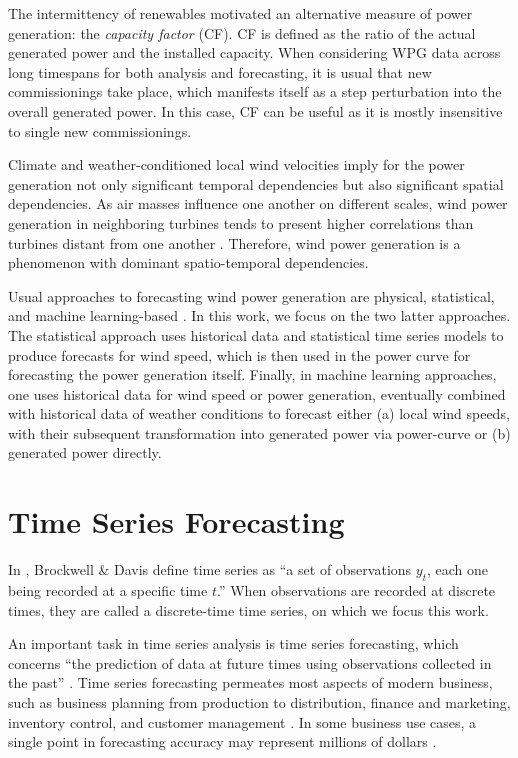 The intermittency of renewables motivated an alternative measure of power generation: the \textit{capacity factor} (CF).
CF is defined as the ratio of the actual generated power and the installed capacity.
When considering WPG data across long timespans for both analysis and forecasting, it is usual that new commissionings take place, which manifests itself as a step perturbation into the overall generated power.
In this case, CF can be useful as it is mostly insensitive to single new commissionings.

Climate and weather-conditioned local wind velocities imply for the power generation not only significant temporal dependencies but also significant spatial dependencies.
As air masses influence one another on different scales, wind power generation in neighboring turbines tends to present higher correlations than turbines distant from one another \cite{engeland2017variability}.
Therefore, wind power generation is a phenomenon with dominant spatio-temporal dependencies.

Usual approaches to forecasting wind power generation are physical, statistical, and machine learning-based \cite{jung2014forecasting}.
In this work, we focus on the two latter approaches.
The statistical approach uses historical data and statistical time series models to produce forecasts for wind speed, which is then used in the power curve for forecasting the power generation itself.
Finally, in machine learning approaches, one uses historical data for wind speed or power generation, eventually combined with historical data of weather conditions to forecast either (a) local wind speeds, with their subsequent transformation into generated power via power-curve or (b) generated power directly.

\section{Time Series Forecasting}

In \cite{brockwell1996introduction}, Brockwell \& Davis define time series as ``a set of observations $y_t$, each one being recorded at a specific time $t$.'' When observations are recorded at discrete times, they are called a discrete-time time series, on which we focus this work.

An important task in time series analysis is time series forecasting, which concerns ``the prediction of data at future times using observations collected in the past'' \cite{hyndman2018principles}. Time series forecasting permeates most aspects of modern business, such as business planning from production to distribution,  finance and marketing, inventory control, and customer management \cite{oreshkin2019nbeats}.
In some business use cases, a single point in forecasting accuracy may represent millions of dollars \cite{kahn2003measure, jain2012answers}.

